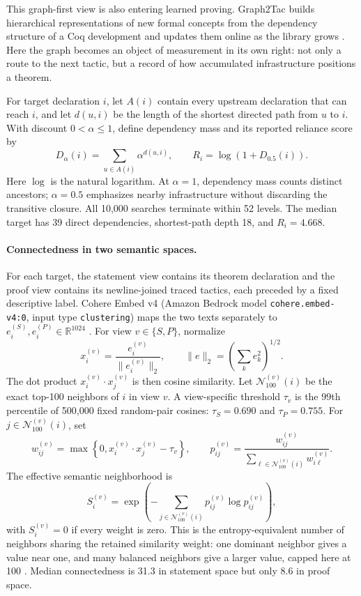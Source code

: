 \documentclass[11pt]{article}
\begin{document}
This graph-first view is also entering learned proving.  Graph2Tac builds hierarchical
representations of new formal concepts from the dependency structure of a Coq development and
updates them online as the library grows \cite{graph2tac}.  Here the graph becomes an object of
measurement in its own right: not only a route to the next tactic, but a record of how accumulated
infrastructure positions a theorem.

For target declaration $i$, let $A(i)$ contain every upstream declaration that can reach $i$, and
let $d(u,i)$ be the length of the shortest directed path from $u$ to $i$.  With discount
$0<\alpha\leq1$, define dependency mass and its reported reliance score by
\[
 D_\alpha(i)=\sum_{u\in A(i)}\alpha^{d(u,i)},
 \qquad R_i=\log\!\left(1+D_{0.5}(i)\right).
\]
Here $\log$ is the natural logarithm.  At $\alpha=1$, dependency mass counts distinct ancestors;
$\alpha=0.5$ emphasizes nearby infrastructure without discarding the transitive closure.  All
10,000 searches terminate within 52 levels.  The median target has 39 direct dependencies,
shortest-path depth 18, and $R_i=4.668$.

\paragraph{Connectedness in two semantic spaces.}
For each target, the statement view contains its theorem declaration and the proof view contains
its newline-joined traced tactics, each preceded by a fixed descriptive label.  Cohere Embed v4
(Amazon Bedrock model \texttt{cohere.embed-v4:0}, input type \texttt{clustering}) maps the two texts
separately to $e_i^{(S)},e_i^{(P)}\in\mathbb{R}^{1024}$ \cite{cohere}.  For view $v\in\{S,P\}$, normalize
\[
 x_i^{(v)}=\frac{e_i^{(v)}}{\lVert e_i^{(v)}\rVert_2},
 \qquad \lVert e\rVert_2=\left(\sum_k e_k^2\right)^{1/2}.
\]
The dot product $x_i^{(v)}\mathbin{\cdot}x_j^{(v)}$ is then cosine similarity.  Let
$\mathcal N_{100}^{(v)}(i)$ be the exact top-100 neighbors of $i$ in view $v$.  A view-specific
threshold $\tau_v$ is the 99th percentile of 500,000 fixed random-pair cosines: $\tau_S=0.690$
and $\tau_P=0.755$.  For $j\in\mathcal N_{100}^{(v)}(i)$, set
\[
 w_{ij}^{(v)}=\max\!\left\{0,
 x_i^{(v)}\mathbin{\cdot}x_j^{(v)}-\tau_v\right\},\qquad
 p_{ij}^{(v)}=\frac{w_{ij}^{(v)}}{\sum_{\ell\in\mathcal N_{100}^{(v)}(i)}w_{i\ell}^{(v)}}.
\]
The effective semantic neighborhood is
\[
 S_i^{(v)}=\exp\!\left(-\sum_{j\in\mathcal N_{100}^{(v)}(i)}
 p_{ij}^{(v)}\log p_{ij}^{(v)}\right),
\]
with $S_i^{(v)}=0$ if every weight is zero.  This is the entropy-equivalent number of neighbors
sharing the retained similarity weight: one dominant neighbor gives a value near one, and many
balanced neighbors give a larger value, capped here at 100 \cite{hill}.  Median connectedness is 31.3 in
statement space but only 8.6 in proof space.
\end{document}
